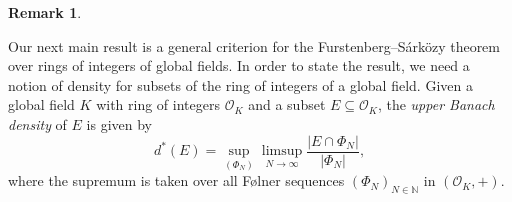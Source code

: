 \documentclass{amsart}
\theoremstyle{definition}
\newtheorem{remark}[theorem]{Remark}
\numberwithin{equation}{section}
\newcommand{\N}{\mathbb{N}}
\newcommand{\mO}{\mathcal{O}}
\begin{document}
\begin{remark}
    \begin{figure}[H]
        \begin{floatrow}
        \centering
        \end{floatrow}
    \end{figure}
\end{remark}

Our next main result is a general criterion for the Furstenberg--S\'{a}rk\"{o}zy theorem over rings of integers of global fields.
In order to state the result, we need a notion of density for subsets of the ring of integers of a global field.
Given a global field $K$ with ring of integers $\mO_K$ and a subset $E \subseteq \mO_K$, the \emph{upper Banach density} of $E$ is given by
\begin{equation*}
    d^*(E) = \sup_{(\Phi_N)} \limsup_{N \to \infty} \frac{|E \cap \Phi_N|}{|\Phi_N|},
\end{equation*}
where the supremum is taken over all F{\o}lner sequences $(\Phi_N)_{N \in \N}$ in $(\mO_K,+)$.
\end{document}
